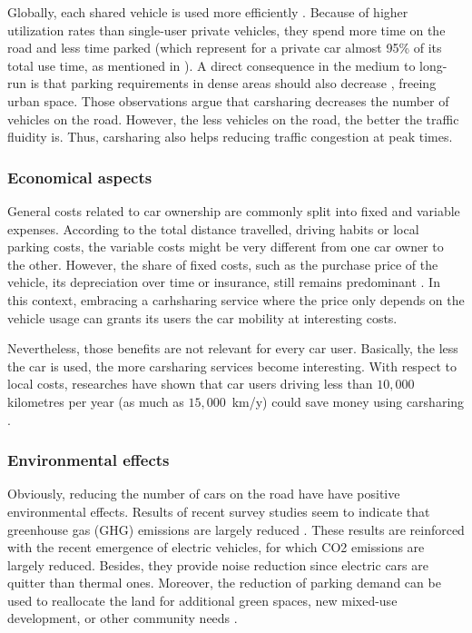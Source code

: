 \begin{bibunit}[ieeetr]
\medskip
Globally, each shared vehicle is used more efficiently \cite{litman_evaluating_2000, schuster_assessing_2005}.
Because of higher utilization rates than single-user private vehicles, they spend more time on the road and less time parked (which represent for a private car almost 95\% of its total use time, as mentioned in \cite{transflash_2013}).
A direct consequence in the medium to long-run is that parking requirements in dense areas should also decrease \cite{mitchell_reinventing_2010}, freeing urban space.
Those observations argue that carsharing decreases the number of vehicles on the road.
However, the less vehicles on the road, the better the traffic fluidity is.
Thus, carsharing also helps reducing traffic congestion at peak times.


\subsubsection{Economical aspects}
General costs related to car ownership are commonly split into fixed and variable expenses.
According to the total distance travelled, driving habits or local parking costs, the variable costs might be very different from one car owner to the other.
However, the share of fixed costs, such as the purchase price of the vehicle, its depreciation over time or insurance, still remains predominant \cite{cout_reel_auto}.
In this context, embracing a carhsharing service where the price only depends on the vehicle usage can grants its users the car mobility at interesting costs.

\medskip
Nevertheless, those benefits are not relevant for every car user.
Basically, the less the car is used, the more carsharing services become interesting.
With respect to local costs, researches have shown that car users driving less than $10,000$ kilometres per year (as much as \hbox{$15,000$ km/y}) could save money using carsharing \cite{litman_evaluating_2000, prettenthaler_ownership_1999}.



\subsubsection{Environmental effects}

Obviously, reducing the number of cars on the road have have positive environmental effects.
Results of recent survey studies seem to indicate that greenhouse gas (GHG) emissions are largely reduced 
\cite{martin_greenhouse_2011, firnkorn_what_2011}.
These results are reinforced with the recent emergence of electric vehicles, for which CO2 emissions are largely reduced.
Besides, they provide noise reduction since electric cars are quitter than thermal ones.
Moreover, the reduction of parking demand can be used to reallocate the land for additional green spaces, new mixed-use development, or other community needs \cite{cohen_carsharing_2008}.



\end{bibunit}
